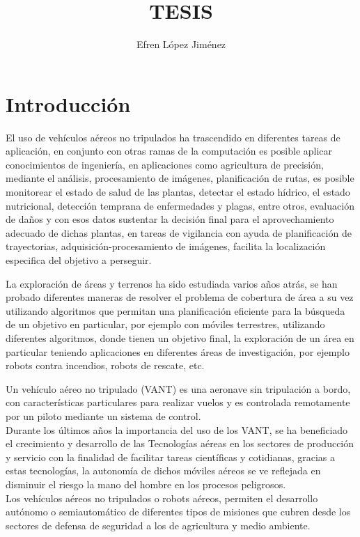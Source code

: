 \documentclass[]{report}
\title{TESIS}
\author{Efren López Jiménez}
\begin{document}
	

	

\newpage\null\thispagestyle{empty}\newpage
	

\begin{abstract}
	

\end{abstract}
\afterpage{\null\newpage}
\newpage
{}
\tableofcontents
\listoffigures
\listoftables
\def\BState{\State\hskip-\ALG@thistlm}

\chapter{Introducción}
El uso de vehículos aéreos no tripulados ha trascendido en diferentes tareas de aplicación, en conjunto con otras ramas de la computación es posible aplicar conocimientos de ingeniería, en aplicaciones como agricultura de precisión, mediante el análisis, procesamiento de imágenes, planificación de rutas, es posible monitorear el estado de salud de las plantas, detectar el estado hídrico, el estado nutricional, detección temprana de enfermedades y plagas, entre otros, evaluación de daños y con esos datos sustentar la decisión final para el aprovechamiento adecuado de dichas plantas, en tareas de vigilancia con ayuda de planificación de trayectorias, adquisición-procesamiento de imágenes, facilita la localización especifica del objetivo a perseguir.

La exploración de áreas y terrenos ha sido estudiada varios años atrás, se han probado diferentes maneras de resolver el problema de cobertura de área a su vez utilizando algoritmos que permitan una planificación eficiente para la búsqueda de un objetivo en particular, por ejemplo con móviles terrestres, utilizando diferentes algoritmos, donde tienen un objetivo final, la exploración de un área en particular teniendo aplicaciones en diferentes áreas de investigación, por ejemplo robots contra incendios, robots de rescate, etc.

Un vehículo aéreo no tripulado (VANT) es una aeronave sin tripulación a bordo, con características particulares para realizar vuelos y es controlada remotamente por un piloto mediante un sistema de control.
\\Durante los últimos años la importancia del uso de los VANT, se ha beneficiado el crecimiento y desarrollo de las Tecnologías aéreas en los sectores de producción y servicio con la finalidad de facilitar tareas científicas y cotidianas, gracias a estas tecnologías, la autonomía de dichos móviles aéreos se ve reflejada en disminuir el riesgo la mano del hombre en los procesos peligrosos.
\\Los vehículos aéreos no tripulados o robots aéreos, permiten el desarrollo autónomo o semiautomático de diferentes tipos de misiones que cubren desde los sectores de defensa de seguridad a los de agricultura y medio ambiente.\cite{srBarrientos}\\
\end{document}
